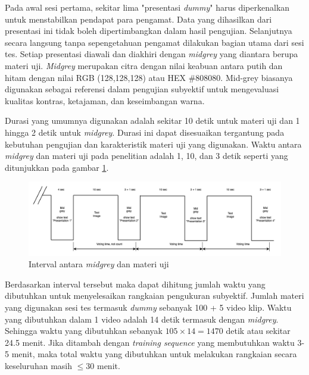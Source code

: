 Pada awal sesi pertama, sekitar lima "presentasi \textit{dummy}" harus diperkenalkan untuk menstabilkan pendapat para pengamat. Data yang dihasilkan dari presentasi ini tidak boleh dipertimbangkan dalam hasil pengujian. Selanjutnya secara langsung tanpa sepengetahuan pengamat dilakukan bagian utama dari sesi tes. Setiap presentasi diawali dan diakhiri dengan \textit{midgrey} yang diantara berupa materi uji. \textit{Midgrey} merupakan citra dengan nilai keabuan antara putih dan hitam dengan nilai RGB (128,128,128) atau HEX \#808080. Mid-grey biasanya digunakan sebagai referensi dalam pengujian subyektif untuk mengevaluasi kualitas kontras, ketajaman, dan keseimbangan warna.

Durasi yang umumnya digunakan adalah sekitar 10 detik untuk materi uji dan 1 hingga 2 detik untuk \textit{midgrey}. Durasi ini dapat disesuaikan tergantung pada kebutuhan pengujian dan karakteristik materi uji yang digunakan. Waktu antara \textit{midgrey} dan materi uji pada penelitian adalah 1, 10, dan 3 detik seperti yang ditunjukkan pada gambar \ref{midgrey-time}.

\begin{figure}[H]
	\vspace{-0.1cm}
	\begin{center}
		\includegraphics[width=1\columnwidth]{bab3/Gambar/midgrey-time.png}
	\end{center}
	\vspace{-0.2cm}
	\caption{Interval antara \textit{midgrey} dan materi uji} \label{midgrey-time}
\end{figure}

Berdasarkan interval tersebut maka dapat dihitung jumlah waktu yang dibutuhkan untuk menyelesaikan rangkaian pengukuran subyektif. Jumlah materi yang digunakan sesi tes termasuk \textit{dummy} sebanyak 100 + 5 video klip. Waktu yang dibutuhkan dalam 1 video adalah 14 detik termasuk dengan \textit{midgrey}. Sehingga waktu yang dibutuhkan sebanyak $105\times14 = 1470$ detik atau sekitar 24.5 menit. Jika ditambah dengan \textit{training sequence} yang membutuhkan waktu 3-5 menit, maka total waktu yang dibutuhkan untuk melakukan rangkaian secara keseluruhan masih $\le 30$ menit.


